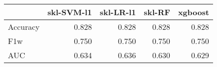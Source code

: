 \begin{tabular}{lrrrr}
\toprule
{} &  skl-SVM-l1 &  skl-LR-l1 &  skl-RF &  xgboost \\
\midrule
Accuracy &       0.828 &      0.828 &   0.828 &    0.828 \\
F1w      &       0.750 &      0.750 &   0.750 &    0.750 \\
AUC      &       0.634 &      0.636 &   0.630 &    0.629 \\
\bottomrule
\end{tabular}
